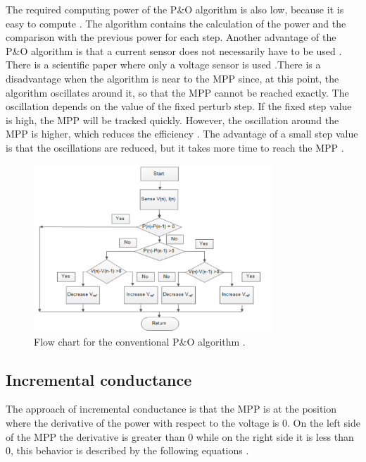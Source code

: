 The required computing power of the P\&O algorithm is also low, because it is easy to compute . The algorithm contains the calculation of the power and the comparison with the previous power for each step. Another advantage  of the P\&O algorithm is that a current sensor does not necessarily have to be used  . There is a scientific paper where only a voltage sensor is used \cite{withoutcurrent}.There is a disadvantage when the algorithm is near to the MPP since, at this point, the algorithm oscillates around it, so that the MPP cannot be reached exactly. The oscillation depends on the value of the fixed perturb step. If the fixed step value is high, the MPP will be tracked quickly. However, the oscillation around the MPP is higher, which reduces the efficiency . The advantage of a small step value is that the oscillations are reduced, but it takes more time to reach the MPP \cite{AN1521_MC}. 

\begin{figure}[H]
	\begin{center}
		\includegraphics[width=0.8\textwidth]{../Pictures/P1/Flow_chart/flow_chart_perturb_observe}
		\caption{Flow chart for the conventional P\&O algorithm \cite{PerturbObserveFC}.}
		\label{fcperturbandobserve}
	\end{center}	
\end{figure}

\subsection{Incremental conductance}
The approach of incremental conductance is that the MPP is at the position where the derivative of the power with respect to the voltage is 0. On the left side of the MPP the derivative is greater than 0 while on the right side it is less than 0, this behavior is described by the following equations .

